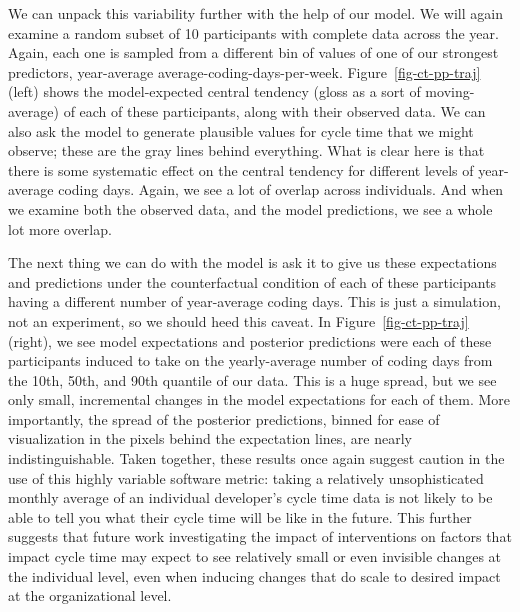\documentclass[manuscript,screen,review]{acmart}
\begin{document}
We can unpack this variability further with the help of our model. We
will again examine a random subset of 10 participants with complete data
across the year. Again, each one is sampled from a different bin of
values of one of our strongest predictors, year-average
average-coding-days-per-week. Figure~\ref{fig-ct-pp-traj} (left) shows
the model-expected central tendency (gloss as a sort of moving-average)
of each of these participants, along with their observed data. We can
also ask the model to generate plausible values for cycle time that we
might observe; these are the gray lines behind everything. What is clear
here is that there is some systematic effect on the central tendency for
different levels of year-average coding days. Again, we see a lot of
overlap across individuals. And when we examine both the observed data,
and the model predictions, we see a whole lot more overlap.

The next thing we can do with the model is ask it to give us these
expectations and predictions under the counterfactual condition of each
of these participants having a different number of year-average coding
days. This is just a simulation, not an experiment, so we should heed
this caveat. In Figure~\ref{fig-ct-pp-traj} (right), we see model
expectations and posterior predictions were each of these participants
induced to take on the yearly-average number of coding days from the
10th, 50th, and 90th quantile of our data. This is a huge spread, but we
see only small, incremental changes in the model expectations for each
of them. More importantly, the spread of the posterior predictions,
binned for ease of visualization in the pixels behind the expectation
lines, are nearly indistinguishable. Taken together, these results once
again suggest caution in the use of this highly variable software
metric: taking a relatively unsophisticated monthly average of an
individual developer's cycle time data is not likely to be able to tell
you what their cycle time will be like in the future. This further
suggests that future work investigating the impact of interventions on
factors that impact cycle time may expect to see relatively small or
even invisible changes at the individual level, even when inducing
changes that do scale to desired impact at the organizational level.
\end{document}
